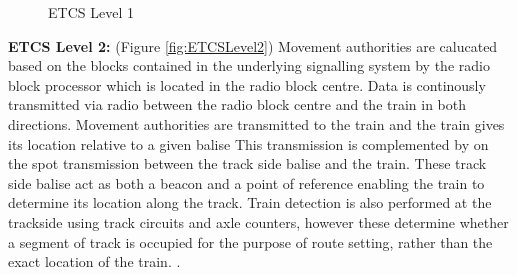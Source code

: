 \begin{center}
\begin{figure}[h!]



 \caption{ETCS Level 1}
\label{fig:ETCSLevel1}
\end{figure}
\end{center}

\textbf{ETCS Level 2:}  (Figure \ref{fig:ETCSLevel2})  Movement authorities are calucated based on the blocks contained in the underlying signalling system by the radio block processor which is located in the radio block centre. Data is continously transmitted via radio between the radio block centre and the train in both directions. Movement authorities are transmitted to the train and the train gives its location relative to a given balise This transmission is complemented by on the spot transmission between the track side balise and the train. These track side balise act as both a beacon and a point of reference enabling the train to determine its location along the track. Train detection is also performed at the trackside using track circuits and axle counters, however these determine whether a segment of track is occupied for the purpose of route setting, rather than the exact location of the train.  .\\



